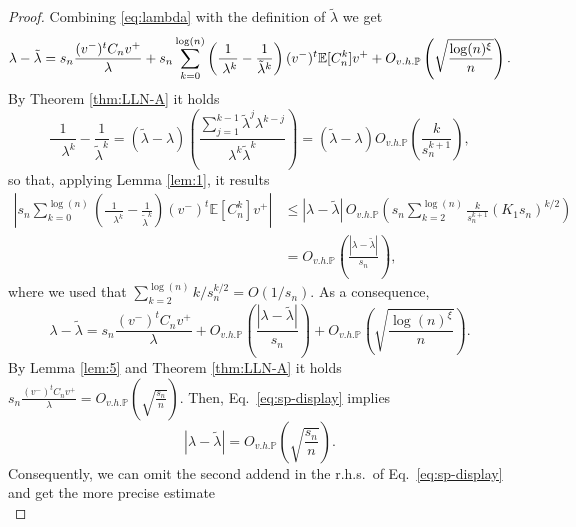 \documentclass[11pt,oneside]{amsart}
\theoremstyle{plain}
\numberwithin{equation}{section}
\newcommand{\E}{\mathbb{E}}
\newcommand{\p}{\mathbb{P}}
\newcommand{\centered}{C_n}
\newcommand{\scaling}{s_n}
\newcommand{\Ohp}{O_{v.h.\p}}
\begin{document}
\begin{proof}
Combining \eqref{eq:lambda} with the definition of $\tilde \lambda$ we get
\begin{equation} \label{eq:equation-H^{(3)}_n}
    \lambda-\tilde\lambda
    = \scaling\frac{(v^-)^t \centered v^+}{\lambda}+\scaling\sum_{k=0}^{\log(n)}\left(\frac{1}{\phantom{\tilde\lambda} \!\!\!\!\ \lambda^k}-\frac{1}{\tilde\lambda^k}\right) (v^-)^t {\E[C^k_n]} v^+ + \Ohp\left(\sqrt{\frac{\log(n)^{\xi}}{n}}\right).
\end{equation}
By Theorem \ref{thm:LLN-A} it holds
\begin{equation} \label{eq:frac1}
    \frac{1}{\phantom{\tilde\lambda} \!\!\!\!\ \lambda^k}-\frac{1}{\tilde\lambda^k}= (\tilde\lambda-\lambda)\left(\frac{\sum_{j=1}^{k-1}\tilde\lambda^j \lambda^{k-j}}{\lambda^k\tilde\lambda^k}\right)=(\tilde\lambda-\lambda)\Ohp\left(\frac{k}{\scaling^{k+1}}\right),
\end{equation}
so that, applying Lemma \ref{lem:1}, it results
\begin{equation} \label{eq:frac2}
\begin{split}
    \left|\scaling\sum_{k=0}^{\log(n)}\left(\frac{1}{\phantom{\tilde\lambda} \!\!\!\!\ \lambda^k}-\frac{1}{\tilde\lambda^k}\right) (v^-)^t {\E[C^k_n]} v^+\right|
    & \le |\lambda-\tilde\lambda|\, \Ohp\left( \scaling \sum_{k=2}^{\log(n)} \frac{k}{\scaling^{k+1}} (K_1 \scaling)^{k/2}\right)\\
    & =\Ohp\left(\frac{|\lambda-\tilde\lambda|}{\scaling}\right),
\end{split}
\end{equation}
where we used that $\sum_{k=2}^{\log(n)} k/\scaling^{k/2}= O(1/\scaling)$.
As a consequence,
\begin{equation} \label{eq:sp-display}
    \lambda-\tilde\lambda=\scaling\frac{(v^-)^t \centered v^+}{\lambda} + \Ohp\left(\frac{|\lambda-\tilde\lambda|}{\scaling}\right)+ \Ohp\left(\sqrt{\frac{\log(n)^{\xi}}{n}}\right).
\end{equation}
By Lemma \ref{lem:5} and Theorem \ref{thm:LLN-A} it holds $\scaling\frac{(v^-)^t {\centered} v^+}{\lambda} = \Ohp(\sqrt{\frac{\scaling}{n}})$. Then, Eq.\ \eqref{eq:sp-display} implies 
\begin{equation} \label{eq:lambdas}
|\lambda-\tilde\lambda|=  \Ohp\left(\sqrt{\frac{\scaling}{n}}\right).\end{equation}
Consequently, we can omit the second addend in the r.h.s.\ of Eq.\ \eqref{eq:sp-display} and get the more precise estimate
    \begin{equation} \label{eq:lambda-2}

\end{equation}
\end{proof}
\end{document}

